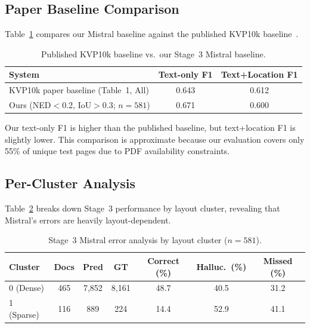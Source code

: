 \subsection{Paper Baseline Comparison}

Table~\ref{tab:paper-comparison} compares our Mistral baseline against the
published KVP10k baseline~\cite{kvp10k}.

\begin{table}[ht]
  \centering
  \caption{Published KVP10k baseline vs.\ our Stage~3 Mistral baseline.}
  \label{tab:paper-comparison}
  \begin{tabular}{@{}lcc@{}}
    \toprule
    \textbf{System} & \textbf{Text-only F1} & \textbf{Text+Location F1} \\
    \midrule
    KVP10k paper baseline (Table~1, All) & 0.643 & 0.612 \\
    Ours (NED$<$0.2, IoU$>$0.3; $n=581$) & 0.671 & 0.600 \\
    \bottomrule
  \end{tabular}
\end{table}

Our text-only F1 is higher than the published baseline, but text+location F1
is slightly lower. This comparison is approximate because our evaluation
covers only 55\% of unique test pages due to PDF availability constraints.

\subsection{Per-Cluster Analysis}
\label{sec:stage3-per-cluster}

Table~\ref{tab:stage3-cluster} breaks down Stage~3 performance by layout
cluster, revealing that Mistral's errors are heavily layout-dependent.

\begin{table}[ht]
  \centering
  \caption{Stage~3 Mistral error analysis by layout cluster ($n = 581$).}
  \label{tab:stage3-cluster}
  \begin{tabular}{@{}lcccccc@{}}
    \toprule
    \textbf{Cluster} & \textbf{Docs} & \textbf{Pred} & \textbf{GT}
                     & \textbf{Correct (\%)} & \textbf{Halluc.\ (\%)}
                     & \textbf{Missed (\%)} \\
    \midrule
    0 (Dense)  & 465 & 7{,}852 & 8{,}161 & 48.7 & 40.5 & 31.2 \\
    1 (Sparse) & 116 &    889 &    224 & 14.4 & 52.9 & 41.1 \\
    \bottomrule
  \end{tabular}
\end{table}

